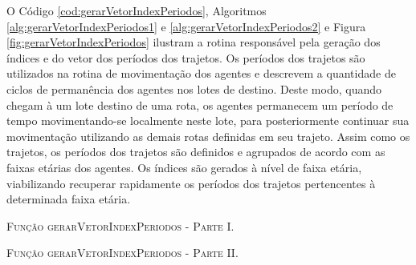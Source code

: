 O Código \ref{cod:gerarVetorIndexPeriodos}, Algoritmos \ref{alg:gerarVetorIndexPeriodos1} e \ref{alg:gerarVetorIndexPeriodos2} e Figura \ref{fig:gerarVetorIndexPeriodos} ilustram a rotina responsável pela geração dos índices e do vetor dos períodos dos trajetos. Os períodos dos trajetos são utilizados na rotina de movimentação dos agentes e descrevem a quantidade de ciclos de permanência dos agentes nos lotes de destino. Deste modo, quando chegam à um lote destino de uma rota, os agentes permanecem um período de tempo movimentando-se localmente neste lote, para posteriormente continuar sua movimentação utilizando as demais rotas definidas em seu trajeto. Assim como os trajetos, os períodos dos trajetos são definidos e agrupados de acordo com as faixas etárias dos agentes. Os índices são gerados à nível de faixa etária, viabilizando recuperar rapidamente os períodos dos trajetos pertencentes à determinada faixa etária. 



\begin{algorithm}[H]
   \SetAlgoLined   
   
   \caption{\textsc{Função gerarVetorIndexPeriodos - Parte I.}}
   \label{alg:gerarVetorIndexPeriodos1}
\end{algorithm}

\newpage

\begin{algorithm}[H]
   \SetAlgoLined   
   
   \caption{\textsc{Função gerarVetorIndexPeriodos - Parte II.}}
   \label{alg:gerarVetorIndexPeriodos2}
\end{algorithm}

